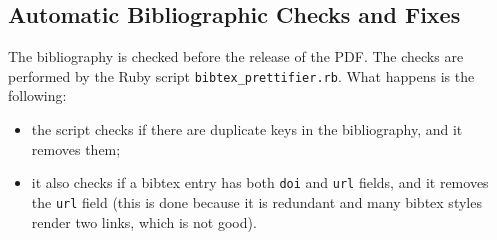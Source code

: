 \documentclass[final,5pt,times,twocolumn]{elsarticle}
\begin{document}
        \subsection{Automatic Bibliographic Checks and Fixes}\label{subsec:automatic-checks-and-fixes-on-the-bibliography}
            The bibliography is checked before the release of the PDF.
            The checks are performed by the Ruby script \texttt{bibtex\_prettifier.rb}.
            What happens is the following:
            \begin{itemize}
                \item the script checks if there are duplicate keys in the bibliography, and it removes them;
                \item it also checks if a bibtex entry has both \texttt{doi} and \texttt{url} fields, and it removes the \texttt{url} field (this is done because it is redundant and many bibtex styles render two links, which is not good).
            \end{itemize}


    \nocite{*}
    
    

    
\end{document}
